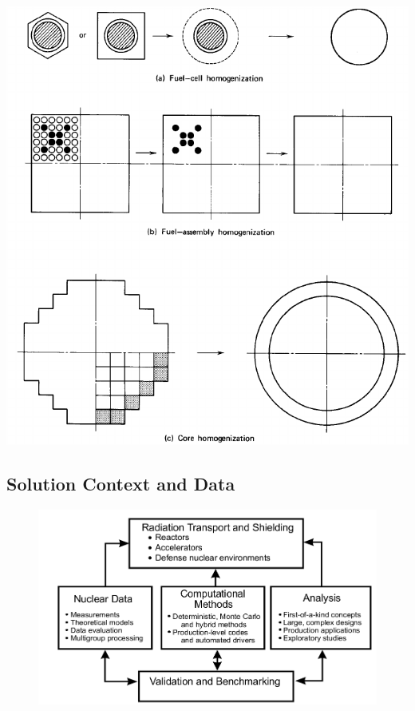 \documentclass[12pt]{article}
\begin{document}
    \begin{center}
    \includegraphics[keepaspectratio, width=\textwidth]{homog.png}
    \end{center}

\pagebreak
\subsection*{Solution Context and Data}%
\begin{figure}[h!]
    \begin{center}
    \includegraphics[keepaspectratio, width = 4.5 in]{solver-map}
    \end{center}
    \label{fig:context}
\end{figure}
\end{document}
